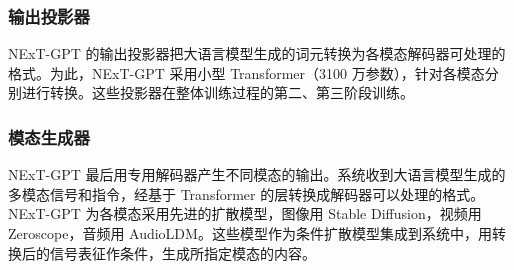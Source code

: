 \subsubsection{输出投影器}
NExT-GPT 的输出投影器把大语言模型生成的词元转换为各模态解码器可处理的格式。为此，NExT-GPT 采用小型 Transformer（3100 万参数），针对各模态分别进行转换。这些投影器在整体训练过程的第二、第三阶段训练。

\subsubsection{模态生成器}
NExT-GPT 最后用专用解码器产生不同模态的输出。系统收到大语言模型生成的多模态信号和指令，经基于 Transformer 的层转换成解码器可以处理的格式。NExT-GPT 为各模态采用先进的扩散模型，图像用 Stable Diffusion，视频用 Zeroscope，音频用 AudioLDM。这些模型作为条件扩散模型集成到系统中，用转换后的信号表征作条件，生成所指定模态的内容。
